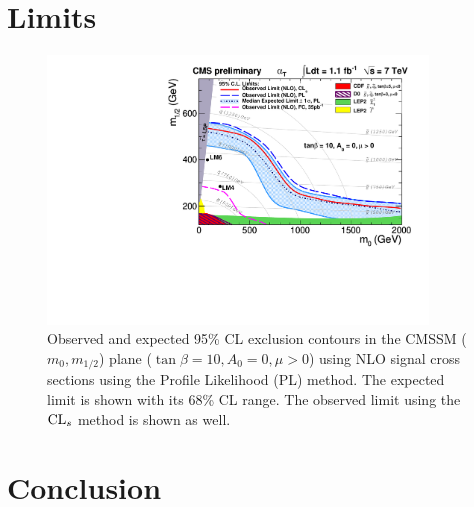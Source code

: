 \section{Limits}

\begin{figure}[h]
  \begin{center}
    \includegraphics[width = 0.90\textwidth]{Figures/Analysis/PAS/RA1_ExclusionLimit_tanb10_def.pdf}
    \caption{\label{fig:cmssm} Observed and expected 95\% CL exclusion
      contours in the CMSSM ($m_0, m_{1/2}$) plane ($\tan \beta = 10,
A_0 = 0, \mu > 0$) using NLO signal cross sections using the
      Profile Likelihood (PL) method. The expected limit is shown with
      its 68\% CL range. The observed limit using the $\mbox{CL$_s$}$ method is
      shown as well. }
  \end{center}
\end{figure}


\section{Conclusion}